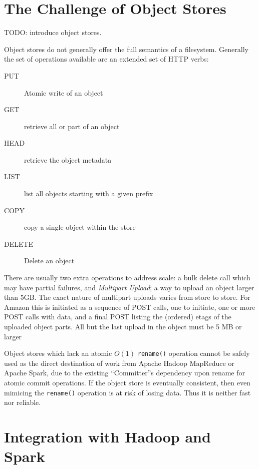 \documentclass[conference]{IEEEtran}
\begin{document}
\section{The Challenge of Object Stores}
\label{sec:object-stores}


TODO: introduce object stores.



Object stores do not generally offer the full semantics of a filesystem.
Generally the set of operations available are an extended set of HTTP verbs:

\begin{description}
  \item[PUT] Atomic write of an object
  \item[GET] retrieve all or part of an object
  \item[HEAD] retrieve the object metadata
  \item[LIST] list all objects starting with a given prefix
  \item[COPY] copy a single object within the store
  \item[DELETE] Delete an object
\end{description}

There are usually two extra operations to address scale:
 a bulk delete call which may have partial failures,
and \emph{Multipart Upload}; a way to upload an object larger than 5GB\@.
The exact nature of multipart uploads varies from store to store.
For Amazon this is initiated as a sequence of POST calls, one to initiate,
one or more POST calls with data, and a final POST listing the (ordered)
etags of the uploaded object parts.
All but the last upload in the object must be 5 MB or larger


Object stores which lack an atomic $O(1)$ \texttt{rename()} operation cannot
be safely used as the direct destination of work from Apache Hadoop MapReduce
or Apache Spark, due to the existing ``Committer''s dependency upon rename for
atomic commit operations.
If the object store is eventually consistent, then even mimicing the \texttt{rename()}
operation is at risk of losing data.
Thus it is neither fast nor reliable.

\section{Integration with Hadoop and Spark}
\label{sec:integration}
\end{document}

